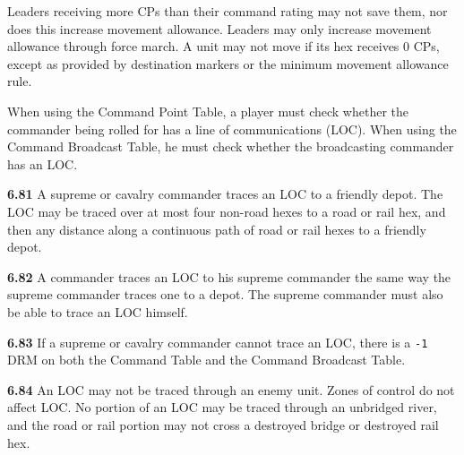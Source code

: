 
Leaders receiving more CPs than their command rating may not save them, nor does this increase movement allowance. Leaders may only increase movement allowance through force march. A unit may not move if its hex receives 0 CPs, except as provided by destination markers or the minimum movement allowance rule.


When using the Command Point Table, a player must check whether the commander being rolled for has a line of communications (LOC). When using the Command Broadcast Table, he must check whether the broadcasting commander has an LOC.

\textbf{6.81} A supreme or cavalry commander traces an LOC to a friendly depot. The LOC may be traced over at most four non-road hexes to a road or rail hex, and then any distance along a continuous path of road or rail hexes to a friendly depot.

\textbf{6.82} A commander traces an LOC to his supreme commander the same way the supreme commander traces one to a depot. The supreme commander must also be able to trace an LOC himself.

\textbf{6.83} If a supreme or cavalry commander cannot trace an LOC, there is a \texttt{-1} DRM on both the Command Table and the Command Broadcast Table.

\textbf{6.84} An LOC may not be traced through an enemy unit. Zones of control do not affect LOC. No portion of an LOC may be traced through an unbridged river, and the road or rail portion may not cross a destroyed bridge or destroyed rail hex.
